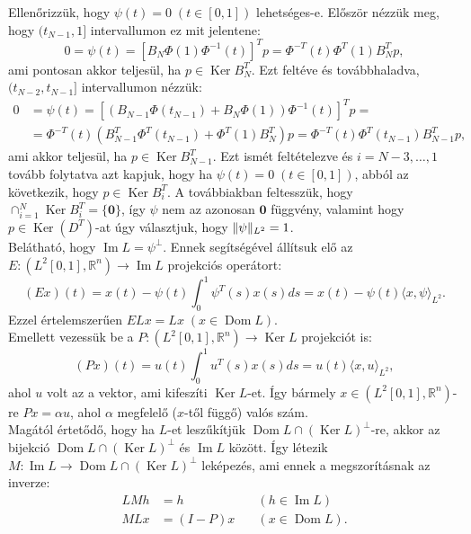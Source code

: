 \documentclass[oneside, titlepage, 12pt, a4paper]{report}
\DeclareMathOperator{\Ima}{Im}	%
\DeclareMathOperator{\Ker}{Ker}	%
\DeclareMathOperator{\Dom}{Dom}	%
\DeclarePairedDelimiter\norm{\lVert}{\rVert}	%
\begin{document}
Ellenőrizzük, hogy $\psi(t) = 0 \; (t \in [0, 1])$ lehetséges-e. Először nézzük meg, hogy $(t_{N-1}, 1]$ intervallumon ez mit jelentene:
\begin{equation*}
0 = \psi(t) = \left[ B_N \Phi(1) \Phi^{-1}(t) \right]^T p = \Phi^{-T}(t) \Phi^T(1) B_N^T p,
\end{equation*}
ami pontosan akkor teljesül, ha $p \in \Ker B_N^T$. Ezt feltéve és továbbhaladva, $(t_{N-2}, t_{N-1}]$ intervallumon nézzük:
\begin{align*}
0 &= \psi(t) = \left[ \left( B_{N-1} \Phi(t_{N-1}) + B_N \Phi(1) \right) \Phi^{-1}(t) \right]^T p =\\
 &= \Phi^{-T}(t) \left( B_{N-1}^T \Phi^T(t_{N-1}) + \Phi^T(1) B_N^T \right) p = \Phi^{-T}(t) \Phi^T(t_{N-1}) B_{N-1}^T p,
\end{align*}
ami akkor teljesül, ha $p \in \Ker B_{N-1}^T$. Ezt ismét feltételezve és $i = N-3, \dots, 1$ tovább folytatva azt kapjuk, hogy ha $\psi(t) = 0 \; (t \in [0, 1])$, abból az következik, hogy $p \in \Ker B_i^T$. A továbbiakban feltesszük, hogy $\cap_{i = 1}^N \Ker B_i^T = \{ \mathbf{0} \}$, így $\psi$ nem az azonosan $\mathbf{0}$ függvény, valamint hogy $p \in \Ker (D^T)$-at úgy választjuk, hogy $\norm{\psi}_{L^2} = 1$. \\
Belátható, hogy $\Ima L = {\psi}^\perp$. %
Ennek segítségével állítsuk elő az $E : ( L^2[0, 1], \mathbb{R}^n) \rightarrow \Ima L$ projekciós operátort:
\begin{equation*}
(Ex) (t) = x(t) - \psi(t) \int_0^1 \psi^T(s) x(s) ds = x(t) - \psi(t) \langle x, \psi \rangle_{L^2}.
\end{equation*}
Ezzel értelemszerűen $E L x = L x \; (x \in \Dom L)$. \\
Emellett vezessük be a $P : ( L^2[0, 1], \mathbb{R}^n) \rightarrow \Ker L$ projekciót is:
\begin{equation*}
(Px)(t) = u(t) \int_0^1 u^T(s) x(s) ds = u(t) \langle x, u \rangle_{L^2},
\end{equation*}
ahol $u$ volt az a vektor, ami kifeszíti $\Ker L$-et. Így bármely $x \in ( L^2[0, 1], \mathbb{R}^n)$-re $Px = \alpha u$, ahol $\alpha$ megfelelő ($x$-től függő) valós szám. \\
Magától értetődő, hogy ha $L$-et leszűkítjük $\Dom L \cap (\Ker L)^\perp$-re, akkor az bijekció $\Dom L \cap (\Ker L)^\perp$ és $\Ima L$ között. Így létezik $M : \Ima L \rightarrow \Dom L \cap (\Ker L)^\perp$ leképezés, ami ennek a megszorításnak az inverze:
\begin{align*}
L M h &= h \quad &(h \in \Ima L) \\
M L x &= (I - P) x \quad &(x \in \Dom L).
\end{align*}
\end{document}
